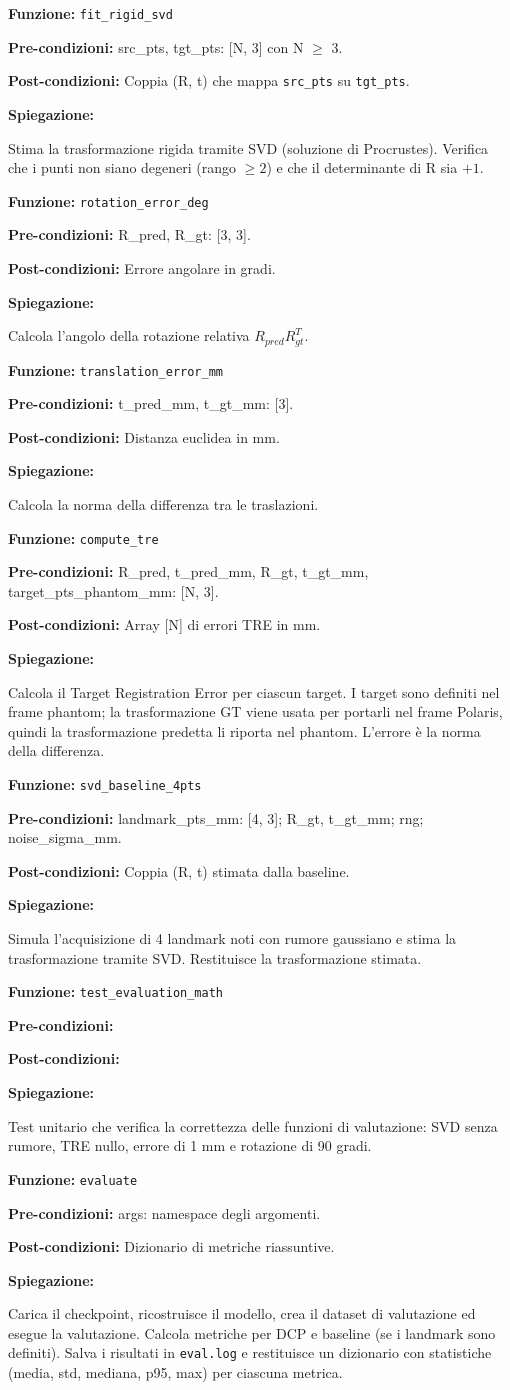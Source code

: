 \documentclass[11pt,a4paper]{article}
\newenvironment{functionspec}[3]{%
    \par\medskip\noindent
    \textbf{Funzione:} \texttt{#1}\par
    \textbf{Pre-condizioni:} #2\par
    \textbf{Post-condizioni:} #3\par
    \textbf{Spiegazione:}\par\noindent\ignorespaces
}{%
    \par\medskip
}
\begin{document}
\begin{functionspec}{fit\_rigid\_svd}{src\_pts, tgt\_pts: [N, 3] con N \(\geq\) 3.}{Coppia (R, t) che mappa \texttt{src\_pts} su \texttt{tgt\_pts}.}
Stima la trasformazione rigida tramite SVD (soluzione di Procrustes). Verifica che i punti non siano degeneri (rango \(\geq 2\)) e che il determinante di R sia \(+1\).
\end{functionspec}

\begin{functionspec}{rotation\_error\_deg}{R\_pred, R\_gt: [3, 3].}{Errore angolare in gradi.}
Calcola l'angolo della rotazione relativa \(R_{pred} R_{gt}^T\).
\end{functionspec}

\begin{functionspec}{translation\_error\_mm}{t\_pred\_mm, t\_gt\_mm: [3].}{Distanza euclidea in mm.}
Calcola la norma della differenza tra le traslazioni.
\end{functionspec}

\begin{functionspec}{compute\_tre}{R\_pred, t\_pred\_mm, R\_gt, t\_gt\_mm, target\_pts\_phantom\_mm: [N, 3].}{Array [N] di errori TRE in mm.}
Calcola il Target Registration Error per ciascun target. I target sono definiti nel frame phantom; la trasformazione GT viene usata per portarli nel frame Polaris, quindi la trasformazione predetta li riporta nel phantom. L'errore è la norma della differenza.
\end{functionspec}

\begin{functionspec}{svd\_baseline\_4pts}{landmark\_pts\_mm: [4, 3]; R\_gt, t\_gt\_mm; rng; noise\_sigma\_mm.}{Coppia (R, t) stimata dalla baseline.}
Simula l'acquisizione di 4 landmark noti con rumore gaussiano e stima la trasformazione tramite SVD. Restituisce la trasformazione stimata.
\end{functionspec}

\begin{functionspec}{test\_evaluation\_math}{}{}
Test unitario che verifica la correttezza delle funzioni di valutazione: SVD senza rumore, TRE nullo, errore di 1 mm e rotazione di 90 gradi.
\end{functionspec}

\begin{functionspec}{evaluate}{args: namespace degli argomenti.}{Dizionario di metriche riassuntive.}
Carica il checkpoint, ricostruisce il modello, crea il dataset di valutazione ed esegue la valutazione. Calcola metriche per DCP e baseline (se i landmark sono definiti). Salva i risultati in \texttt{eval.log} e restituisce un dizionario con statistiche (media, std, mediana, p95, max) per ciascuna metrica.
\end{functionspec}
\end{document}
